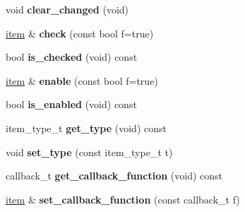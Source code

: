 \begin{DoxyCompactItemize}
\item 
\hypertarget{classDOSBoxMenu_1_1item_a8a64f42af1145ca07b0db0a34b7f9407}{void {\bfseries clear\-\_\-changed} (void)}\label{classDOSBoxMenu_1_1item_a8a64f42af1145ca07b0db0a34b7f9407}

\item 
\hypertarget{classDOSBoxMenu_1_1item_a4d13cddddf7ab8a1c311ddc781898196}{\hyperlink{classDOSBoxMenu_1_1item}{item} \& {\bfseries check} (const bool f=true)}\label{classDOSBoxMenu_1_1item_a4d13cddddf7ab8a1c311ddc781898196}

\item 
\hypertarget{classDOSBoxMenu_1_1item_a8cdc4a5a9fe40d71d7b84dff7b2e3299}{bool {\bfseries is\-\_\-checked} (void) const }\label{classDOSBoxMenu_1_1item_a8cdc4a5a9fe40d71d7b84dff7b2e3299}

\item 
\hypertarget{classDOSBoxMenu_1_1item_af9f552a7693aae84873ef6ec79106b54}{\hyperlink{classDOSBoxMenu_1_1item}{item} \& {\bfseries enable} (const bool f=true)}\label{classDOSBoxMenu_1_1item_af9f552a7693aae84873ef6ec79106b54}

\item 
\hypertarget{classDOSBoxMenu_1_1item_ad6f188960e397cd0e020e6fb30e03b6f}{bool {\bfseries is\-\_\-enabled} (void) const }\label{classDOSBoxMenu_1_1item_ad6f188960e397cd0e020e6fb30e03b6f}

\item 
\hypertarget{classDOSBoxMenu_1_1item_ae488d92ba6ce8eb27bdf45808fa44707}{item\-\_\-type\-\_\-t {\bfseries get\-\_\-type} (void) const }\label{classDOSBoxMenu_1_1item_ae488d92ba6ce8eb27bdf45808fa44707}

\item 
\hypertarget{classDOSBoxMenu_1_1item_a44dd314f3318fb7816240f0549da35e8}{void {\bfseries set\-\_\-type} (const item\-\_\-type\-\_\-t t)}\label{classDOSBoxMenu_1_1item_a44dd314f3318fb7816240f0549da35e8}

\item 
\hypertarget{classDOSBoxMenu_1_1item_ae67fa2fe59c0a6de98ec56a987b0c478}{callback\-\_\-t {\bfseries get\-\_\-callback\-\_\-function} (void) const }\label{classDOSBoxMenu_1_1item_ae67fa2fe59c0a6de98ec56a987b0c478}

\item 
\hypertarget{classDOSBoxMenu_1_1item_ad2edb25317c12221e63c8a48892f45b5}{\hyperlink{classDOSBoxMenu_1_1item}{item} \& {\bfseries set\-\_\-callback\-\_\-function} (const callback\-\_\-t f)}\label{classDOSBoxMenu_1_1item_ad2edb25317c12221e63c8a48892f45b5}


\end{DoxyCompactItemize}
